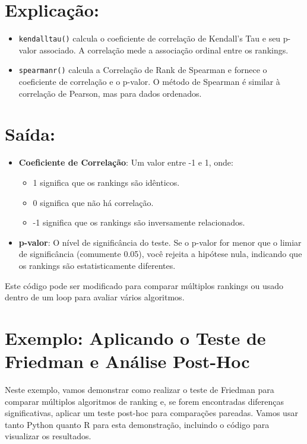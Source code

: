 \documentclass{article}
\begin{document}
\section*{Explicação:}
\begin{itemize}
    \item \texttt{kendalltau()} calcula o coeficiente de correlação de Kendall's Tau e seu p-valor associado. A correlação mede a associação ordinal entre os rankings.
    \item \texttt{spearmanr()} calcula a Correlação de Rank de Spearman e fornece o coeficiente de correlação e o p-valor. O método de Spearman é similar à correlação de Pearson, mas para dados ordenados.
\end{itemize}

\section*{Saída:}
\begin{itemize}
    \item \textbf{Coeficiente de Correlação}: Um valor entre -1 e 1, onde:
    \begin{itemize}
        \item 1 significa que os rankings são idênticos.
        \item 0 significa que não há correlação.
        \item -1 significa que os rankings são inversamente relacionados.
    \end{itemize}
    \item \textbf{p-valor}: O nível de significância do teste. Se o p-valor for menor que o limiar de significância (comumente 0.05), você rejeita a hipótese nula, indicando que os rankings são estatisticamente diferentes.
\end{itemize}

Este código pode ser modificado para comparar múltiplos rankings ou usado dentro de um loop para avaliar vários algoritmos. 

\section*{Exemplo: Aplicando o Teste de Friedman e Análise Post-Hoc}

Neste exemplo, vamos demonstrar como realizar o teste de Friedman para comparar múltiplos algoritmos de ranking e, se forem encontradas diferenças significativas, aplicar um teste post-hoc para comparações pareadas. Vamos usar tanto Python quanto R para esta demonstração, incluindo o código para visualizar os resultados.
\end{document}
